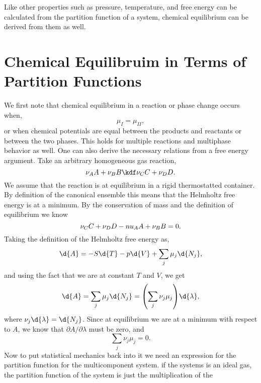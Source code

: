 Like other properties such as pressure, temperature, and free energy can be
calculated from the partition function of a system, chemical equilibrium can be
derived from them as well.

\section{Chemical Equilibruim in Terms of Partition Functions}%
\label{sec:chemeqetpf}
We first note that chemical equilibrium in a reaction or phase change occurs
when,
\begin{equation*}
	\mu_I = \mu_{II},
\end{equation*}
or when chemical potentials are equal between the products and reactants or
between the two phases. This holds for multiple reactions and multiphase
behavior as well. One can also derive the necessary relations from a free energy
argument. Take an arbitrary homogeneous gas reaction,
\begin{equation*}
	\nu_A A + \nu_B B \kdf \nu_C C + \nu_D D.
\end{equation*}
We assume that the reaction is at equilibrium in a rigid thermostatted
container. By definition of the canonical ensemble this means that the Helmholtz
free energy is at a minimum. By the conservation of mass and the definition of
equilibrium we know
\begin{equation*}
	\nu_C C + \nu_D D - \\nu_A A + \nu_B B = 0.
\end{equation*}
Taking the definition of the Helmholtz free energy as,
\begin{equation*}
	\d{A} = -S\d{T} - p\d{V} + \sum_{j}{\mu_j \d{N_{j}}},
\end{equation*}
and using the fact that we are at constant $T$ and $V$, we get
\begin{equation*}
	\d{A} = \sum_{j}{\mu_j \d{N_{j}}} = {\left(\sum_{j}{\nu_j
	\mu_{j}}\right)}\d{\lambda},
\end{equation*}
where $\nu_j \d{\lambda} = \d{N_{j}}$. Since at equilibrium we are at a minimum
with respect to $A$, we know that $\partial A/ \partial \lambda$ must be zero,
and
\begin{equation*}
	\sum_{j}{\nu_j \mu_j} = 0.
\end{equation*}
Now to put statistical mechanics back into it we need an expression for the
partition function for the multicomponent system.  if the systems is an ideal
gas, the partition function of the system is just the multiplication of the
